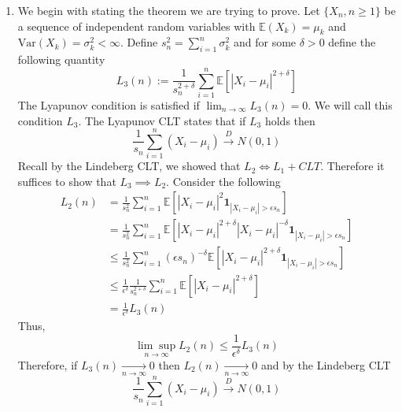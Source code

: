 \documentclass[12pt]{article}  %
\newcommand{\e}{{\epsilon}}
\newcommand{\nsum}{{\sum_{i=1}^n}}
\newcommand{\E}{{\mathbb{E}}}
\newcommand{\V}{{\text{Var}}}
\newcommand{\ind}{{\mathbf{1}}}
\begin{document}
\begin{enumerate}
\item We begin with stating the theorem we are trying to prove. Let $\{X_n, n\geq 1\}$ be a sequence of independent random variables with $\E(X_k) = \mu_k$ and $\V(X_k) = \sigma^2_k<\infty$. Define $s_n^2 = \nsum\sigma_k^2$ and for some $\delta>0$ define the following quantity
 $$L_3(n) := \frac{1}{s_n^{2+\delta}}\nsum \E[|X_i - \mu_i|^{2+\delta}]$$ The Lyapunov condition is satisfied if $\lim_{n\to\infty}L_3(n) = 0$. We will call this condition $L_3$. The Lyapunov CLT states that if $L_3$ holds then $$\frac{1}{s_n}\nsum \left(X_i -\mu_i\right)\overset{D}{\longrightarrow}N(0,1)$$
Recall by the Lindeberg CLT, we showed that $L_2\iff L_1 + CLT$. Therefore it suffices to show that $L_3 \implies L_2$. Consider the following 
\begin{align*}
L_2(n) &= \frac{1}{s_n^2}\nsum\E[|X_i - \mu_i|^2\ind_{|X_i - \mu_i|>\e s_n}] \\
&= \frac{1}{s_n^2}\nsum\E[|X_i - \mu_i|^{2+\delta}|X_i - \mu_i|^{-\delta}\ind_{|X_i - \mu_i|>\e s_n}] \\
&\leq \frac{1}{s_n^2}\nsum(\e s_n)^{-\delta}\E[|X_i - \mu_i|^{2+\delta}\ind_{|X_i - \mu_i|>\e s_n}] \\
&\leq \frac{1}{\e^{\delta}}\frac{1}{s_n^{2 + \delta}}\nsum\E[|X_i - \mu_i|^{2+\delta}] \\
&= \frac{1}{\e^{\delta}}L_3(n)
\end{align*}
Thus, $$\underset{n\to\infty}{\lim\sup} L_2(n)\leq \frac{1}{\e^\delta}L_3(n)$$
Therefore, if $L_3(n)\underset{n\to\infty}{\longrightarrow}0$ then $L_2(n)\underset{n\to\infty}{\longrightarrow}0$ and by the Lindeberg CLT $$\frac{1}{s_n}\nsum \left(X_i -\mu_i\right)\overset{D}{\longrightarrow}N(0,1)$$


\end{enumerate}
\end{document}
